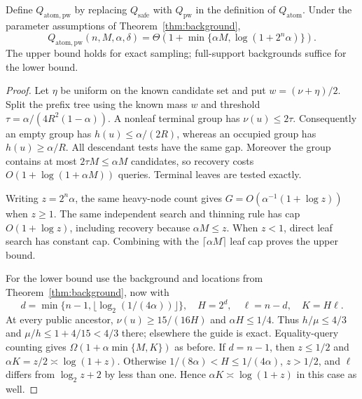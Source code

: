 \begin{proposition}\label{prop:background-pointwise}
Define $Q_{\mathrm{atom,pw}}$ by replacing $Q_{\mathrm{safe}}$ with $Q_{\mathrm{pw}}$ in the definition of $Q_{\mathrm{atom}}$. Under the parameter assumptions of Theorem~\ref{thm:background},
\begin{equation}\label{eq:background-pointwise}
 Q_{\mathrm{atom,pw}}(n,M,\alpha,\delta)
 =\Theta\!\left(1+\min\{\alpha M,\log(1+2^n\alpha)\}\right).
\end{equation}
The upper bound holds for exact sampling; full-support backgrounds suffice for the lower bound.
\end{proposition}
\begin{proof}
Let $\eta$ be uniform on the known candidate set and put $w=(\nu+\eta)/2$. Split the prefix tree using the known mass $w$ and threshold $\tau=\alpha/(4R^2(1-\alpha))$. A nonleaf terminal group has $\nu(u)\le2\tau$. Consequently an empty group has $h(u)\le\alpha/(2R)$, whereas an occupied group has $h(u)\ge\alpha/R$. All descendant tests have the same gap. Moreover the group contains at most $2\tau M\le\alpha M$ candidates, so recovery costs $O(1+\log(1+\alpha M))$ queries. Terminal leaves are tested exactly.

Writing $z=2^n\alpha$, the same heavy-node count gives $G=O(\alpha^{-1}(1+\log z))$ when $z\ge1$. The same independent search and thinning rule has cap $O(1+\log z)$, including recovery because $\alpha M\le z$. When $z<1$, direct leaf search has constant cap. Combining with the $\lceil\alpha M\rceil$ leaf cap proves the upper bound.

For the lower bound use the background and locations from Theorem~\ref{thm:background}, now with
\[
 d=\min\{n-1,\lfloor\log_2(1/(4\alpha))\rfloor\},\quad H=2^d,
 \quad \ell=n-d,\quad K=H\ell.
\]
At every public ancestor, $\nu(u)\ge15/(16H)$ and $\alpha H\le1/4$. Thus $h/\mu\le4/3$ and $\mu/h\le1+4/15<4/3$ there; elsewhere the guide is exact. Equality-query counting gives $\Omega(1+\alpha\min\{M,K\})$ as before. If $d=n-1$, then $z\le1/2$ and $\alpha K=z/2\asymp\log(1+z)$. Otherwise $1/(8\alpha)<H\le1/(4\alpha)$, $z>1/2$, and $\ell$ differs from $\log_2z+2$ by less than one. Hence $\alpha K\asymp\log(1+z)$ in this case as well.
\end{proof}
